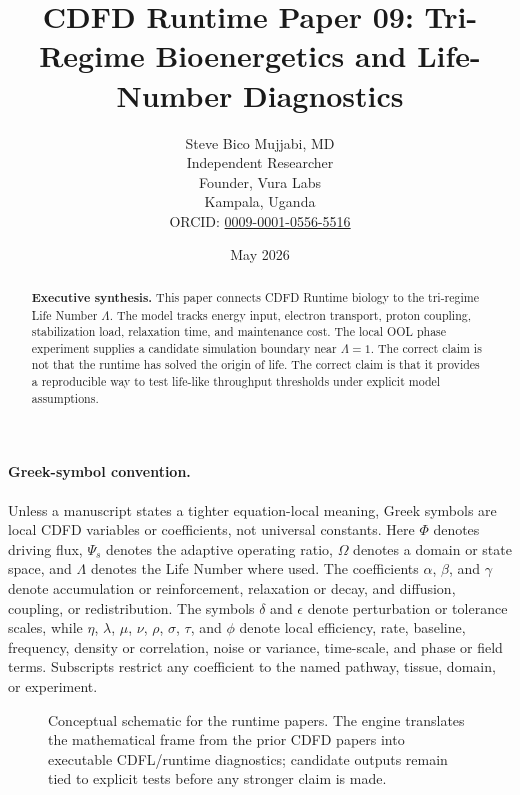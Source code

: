 \documentclass[12pt,a4paper]{article}
\title{\textbf{CDFD Runtime Paper 09: Tri-Regime Bioenergetics and Life-Number Diagnostics}}
\author{Steve Bico Mujjabi, MD\\
\small Independent Researcher\\
\small Founder, Vura Labs\\
\small Kampala, Uganda\\
\small ORCID: \href{https://orcid.org/0009-0001-0556-5516}{0009-0001-0556-5516}}
\date{May 2026}
\begin{document}
\maketitle

\begin{abstract}
\noindent \textbf{Executive synthesis.} This paper connects CDFD Runtime biology
to the tri-regime Life Number $\Lambda$. The model tracks energy input,
electron transport, proton coupling, stabilization load, relaxation time, and
maintenance cost. The local OOL phase experiment supplies a candidate
simulation boundary near $\Lambda=1$. The correct claim is not that the runtime
has solved the origin of life. The correct claim is that it provides a
reproducible way to test life-like throughput thresholds under explicit model
assumptions.
\end{abstract}

\paragraph{Greek-symbol convention.}
Unless a manuscript states a tighter equation-local meaning, Greek symbols are local CDFD variables or coefficients, not universal constants. Here $\Phi$ denotes driving flux, $\Psi_s$ denotes the adaptive operating ratio, $\Omega$ denotes a domain or state space, and $\Lambda$ denotes the Life Number where used. The coefficients $\alpha$, $\beta$, and $\gamma$ denote accumulation or reinforcement, relaxation or decay, and diffusion, coupling, or redistribution. The symbols $\delta$ and $\epsilon$ denote perturbation or tolerance scales, while $\eta$, $\lambda$, $\mu$, $\nu$, $\rho$, $\sigma$, $\tau$, and $\phi$ denote local efficiency, rate, baseline, frequency, density or correlation, noise or variance, time-scale, and phase or field terms. Subscripts restrict any coefficient to the named pathway, tissue, domain, or experiment.


\begin{figure}[ht]
\centering
{}
\caption{Conceptual schematic for the runtime papers. The engine translates the mathematical frame from the prior CDFD papers into executable CDFL/runtime diagnostics; candidate outputs remain tied to explicit tests before any stronger claim is made.}
\end{figure}
\end{document}

